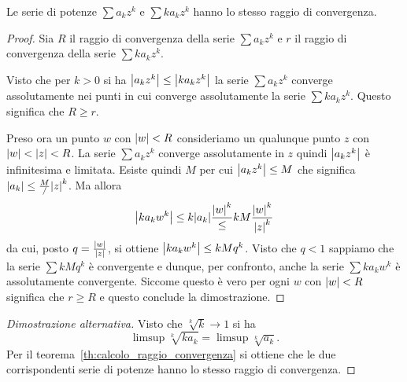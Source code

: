 \begin{theorem}
\label{th:raggio_serie_derivate}
Le serie di potenze $\sum a_k z^k$ e $\sum k a_k z^k$ hanno
lo stesso raggio di convergenza.
\end{theorem}
%
\begin{proof}
  Sia $R$ il raggio di convergenza della serie $\sum a_k z^k$ 
  e $r$ il raggio di convergenza della serie $\sum k a_k z^k$.
  
  Visto che per $k>0$ si ha ${\left|a_k z^k\right|} \le {\left|k a_k z^k\right|}$
  la serie $\sum a_k z^k$ converge assolutamente nei punti 
  in cui converge assolutamente la serie $\sum k a_k z^k$.
  Questo significa che $R\ge r$.

  Preso ora un punto $w$ con ${\left|w\right|}<R$ consideriamo un
  qualunque punto $z$ con ${\left|w\right|}<{\left|z\right|}<R$.
  La serie $\sum a_k z^k$ converge assolutamente in $z$ 
  quindi ${\left|a_k z^k\right|}$ è infinitesima e limitata.
  Esiste quindi $M$ per cui ${\left|a_k z^k\right|}\le M$ 
  che significa ${\left|a_k\right|} \le \frac{M}/{{\left|z\right|}^k}$.
  Ma allora 
  \[
    {\left|k a_k w^k\right|} 
    \le k {\left|a_k\right|} \frac{{\left|w\right|}^k}
    \le k M \frac{{\left|w\right|}^k}{{\left|z\right|}^k}
  \]
  da cui, posto $q=\frac{{\left|w\right|}}{{\left|z\right|}}$, si ottiene 
  ${\left|k a_k w^k\right|} \le k M q^k$. 
  Visto che $q<1$ sappiamo che la serie $\sum k M q^k$ 
  è convergente e dunque, per confronto, anche la 
  serie $\sum k a_k w^k$ è assolutamente convergente.
  Siccome questo è vero per ogni $w$ con ${\left|w\right|}<R$
  significa che $r\ge R$ e questo conclude la dimostrazione.
\end{proof}
%
\begin{proof}[Dimostrazione alternativa]
Visto che $\sqrt[k]{k}\to 1$ si ha
\[
  \limsup \sqrt[k]{k a_k} = \limsup \sqrt[k]{a_k}.
\]
Per il teorema~\ref{th:calcolo_raggio_convergenza} si ottiene
che le due corrispondenti serie di potenze hanno lo stesso raggio di convergenza.
\end{proof}

